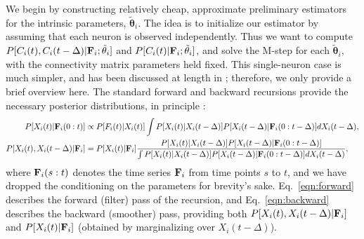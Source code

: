 \documentclass[aoas,preprint]{imsart}
\newcommand{\bth}{\mathbf{\theta}}
\newcommand{\bF}{{\bf F}}
\newcommand{\tbth}{\tilde{\bth}}
\begin{document}
We begin by constructing relatively cheap, approximate preliminary estimators for the intrinsic parameters, $\tbth_i$.
The idea is to initialize our estimator by assuming that each neuron
is observed independently. Thus we want to compute $P[C_i(t),
C_i(t-\Delta) | \bF_i; \tbth_i]$ and $P[C_i(t)|\bF_i;\tbth_i]$, and
solve the M-step for each $\tbth_i$, with the connectivity matrix
parameters held fixed. This single-neuron case is much simpler, and
has been discussed at length in \cite{Vogelstein2009}; therefore, we
only provide a brief overview here. The standard forward and backward
recursions provide the necessary posterior distributions, in principle
\cite{ShumwayStoffer06}:
\begin{align}
P[X_i(t) | \bF_i(0:t)] &\propto P[F_i(t)| X_i(t)] \int P[X_i(t) |
    X_i(t-\Delta)] P[X_i(t-\Delta) | \bF_i(0:t-\Delta)] dX_i(t-\Delta),
\label{eqn:forward} \\
P[X_i(t), X_i(t-\Delta) | \bF_i] &= P[X_i(t) | \bF_i]
\frac{P[X_i(t) | X_i(t-\Delta)] P[X_i(t-\Delta) |
\bF_i(0:t-\Delta)]}{\int P[X_i(t) | X_i(t-\Delta)] P[X_i(t-\Delta) |
\bF_i(0:t-\Delta)] dX_i(t-\Delta)},
\label{eqn:backward}
\end{align}
where $\bF_i(s:t)$ denotes the time series $\bF_i$ from time points
$s$ to $t$, and we have dropped the conditioning on the parameters for
brevity's sake. Eq.~\eqref{eqn:forward} describes the forward (filter)
pass of the recursion, and Eq.~\eqref{eqn:backward} describes the
backward (smoother) pass, providing both $P[X_i(t), X_i(t-\Delta) |
\bF_i]$ and $P[X_i(t) | \bF_i]$ (obtained by marginalizing over
$X_i(t-\Delta)$).
\end{document}
